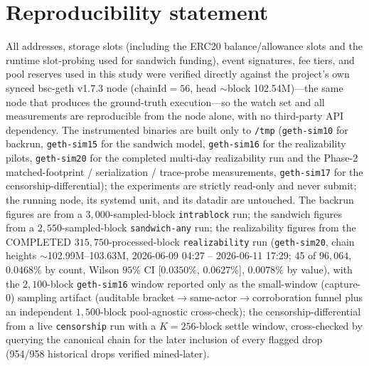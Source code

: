 \documentclass[11pt]{article}
\newcommand{\code}[1]{\texttt{#1}}
\begin{document}
\section*{Reproducibility statement}
All addresses, storage slots (including the ERC20 balance/allowance slots and the
runtime slot-probing used for sandwich funding), event signatures, fee tiers, and pool
reserves used in this study were verified directly against the project's own synced
bsc-geth v1.7.3 node ($\text{chainId}=56$, head $\sim$block 102.54M)---the same node
that produces the ground-truth execution---so the watch set and all measurements are
reproducible from the node alone, with no third-party API dependency. The instrumented
binaries are built only to \code{/tmp} (\code{geth-sim10} for backrun,
\code{geth-sim15} for the sandwich model, \code{geth-sim16} for the realizability
pilots, \code{geth-sim20} for the completed multi-day realizability run and the Phase-2
matched-footprint / serialization / trace-probe measurements, \code{geth-sim17} for the
censorship-differential); the experiments are
strictly read-only and never submit; the running node, its systemd unit, and its datadir
are untouched. The backrun figures are from a $3{,}000$-sampled-block \code{intrablock}
run; the sandwich figures from a $2{,}550$-sampled-block \code{sandwich-any} run; the
realizability figures from the COMPLETED $315{,}750$-processed-block \code{realizability}
run (\code{geth-sim20}, chain heights $\sim$102.99M--103.63M, 2026-06-09 04:27 --
2026-06-11 17:29; 45 of $96{,}064$, $0.0468\%$ by count, Wilson $95\%$ CI [$0.0350\%$,
$0.0627\%$], $0.0078\%$ by value), with the $2{,}100$-block \code{geth-sim16} window
reported only as the small-window (capture-0) sampling artifact (auditable
bracket$\to$same-actor$\to$corroboration funnel plus an independent $1{,}500$-block
pool-agnostic cross-check); the censorship-differential from a live
\code{censorship} run with a $K=256$-block settle window, cross-checked by querying the
canonical chain for the later inclusion of every flagged drop (954/958 historical drops
verified mined-later).



\end{document}
